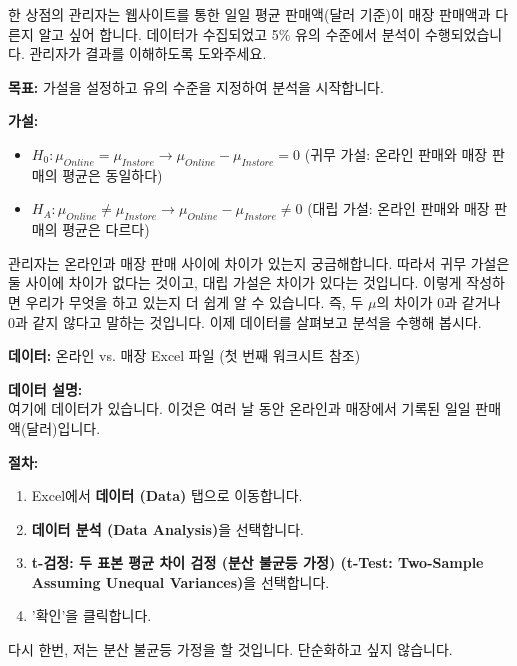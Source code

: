 \documentclass[11pt,a4paper]{article}
\theoremstyle{definition}
\begin{document}
\begin{examplebox}[title=Excel 실습 예시: 온라인 vs. 매장 판매 (신뢰 구간)]
한 상점의 관리자는 웹사이트를 통한 일일 평균 판매액(달러 기준)이 매장 판매액과 다른지 알고 싶어 합니다. 데이터가 수집되었고 5\% 유의 수준에서 분석이 수행되었습니다. 관리자가 결과를 이해하도록 도와주세요.

\textbf{목표:} 가설을 설정하고 유의 수준을 지정하여 분석을 시작합니다.
\end{examplebox}

\begin{infobox}[title=온라인/매장 Excel 워크시트 (2/10): 가설 설정]
\textbf{가설:}
\begin{itemize}
    \item $H_0 : \mu_{Online} = \mu_{Instore} \rightarrow \mu_{Online} - \mu_{Instore} = 0$ (귀무 가설: 온라인 판매와 매장 판매의 평균은 동일하다)
    \item $H_A : \mu_{Online} \neq \mu_{Instore} \rightarrow \mu_{Online} - \mu_{Instore} \neq 0$ (대립 가설: 온라인 판매와 매장 판매의 평균은 다르다)
\end{itemize}
관리자는 온라인과 매장 판매 사이에 차이가 있는지 궁금해합니다. 따라서 귀무 가설은 둘 사이에 차이가 없다는 것이고, 대립 가설은 차이가 있다는 것입니다. 이렇게 작성하면 우리가 무엇을 하고 있는지 더 쉽게 알 수 있습니다. 즉, 두 $\mu$의 차이가 0과 같거나 0과 같지 않다고 말하는 것입니다. 이제 데이터를 살펴보고 분석을 수행해 봅시다.
\end{infobox}

\begin{infobox}[title=온라인/매장 Excel 워크시트 (3/10): 데이터 준비]
\textbf{데이터:} 온라인 vs. 매장 Excel 파일 (첫 번째 워크시트 참조)

\textbf{데이터 설명:} \\
여기에 데이터가 있습니다. 이것은 여러 날 동안 온라인과 매장에서 기록된 일일 판매액(달러)입니다.
\end{infobox}

\begin{infobox}[title=온라인/매장 Excel 워크시트 (4/10): Excel에서 t-검정 선택]
\textbf{절차:}
\begin{enumerate}
    \item Excel에서 \textbf{데이터 (Data)} 탭으로 이동합니다.
    \item \textbf{데이터 분석 (Data Analysis)}을 선택합니다.
    \item \textbf{t-검정: 두 표본 평균 차이 검정 (분산 불균등 가정) (t-Test: Two-Sample Assuming Unequal Variances)}을 선택합니다.
    \item '확인'을 클릭합니다.
\end{enumerate}
다시 한번, 저는 분산 불균등 가정을 할 것입니다. 단순화하고 싶지 않습니다.
\end{infobox}
\end{document}
